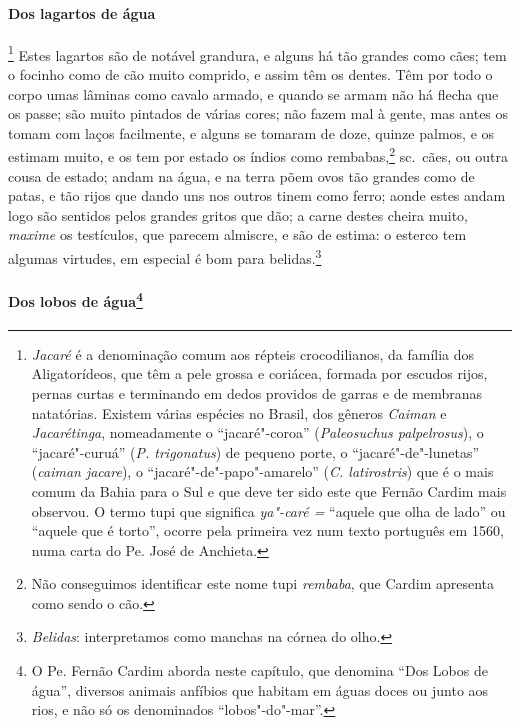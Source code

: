 \paragraph{Dos lagartos de água}

\footnote{ \textit{Jacaré} é a denominação
comum aos répteis crocodilianos, da família dos Aligatorídeos, que têm
a pele grossa e coriácea, formada por escudos rijos, pernas curtas e
terminando em dedos providos de garras e de membranas natatórias.
Existem várias espécies no Brasil, dos gêneros \textit{Caiman} e 
\textit{Jacarétinga}, nomeadamente o ``jacaré"-coroa''
(\textit{Paleosuchus palpelrosus}), o ``jacaré"-curuá'' (\textit{P.
trigonatus}) de pequeno porte, o ``jacaré"-de"-lunetas'' (\textit{caiman
jacare}), o ``jacaré"-de"-papo"-amarelo'' (\textit{C. latirostris}) que é o
mais comum da Bahia para o Sul e que deve ter sido este que Fernão
Cardim mais observou. O termo tupi que significa \textit{ya"-caré =}
``aquele que olha de lado'' ou ``aquele que é torto'', ocorre pela primeira
vez num texto português em 1560, numa carta do Pe. José de
Anchieta.} Estes lagartos são de notável grandura, e alguns
há tão grandes como cães; tem o focinho como de cão muito comprido, e
assim têm os dentes. Têm por todo o corpo umas lâminas como cavalo
armado, e quando se armam não há flecha que os passe; são muito
pintados de várias cores; não fazem mal à gente, mas antes os tomam com
laços facilmente, e alguns se tomaram de doze, quinze palmos, e os
estimam muito, e os tem por estado os índios como rembabas,\footnote{ Não 
conseguimos identificar este nome tupi \textit{rembaba}, que
Cardim apresenta como sendo o cão.} sc.~cães, ou outra cousa de estado;
andam na água, e na terra põem ovos tão grandes como de patas, e tão
rijos que dando uns nos outros tinem como ferro; aonde estes andam logo
são sentidos pelos grandes gritos que dão; a carne destes cheira muito,
\textit{maxime} os testículos, que parecem almiscre, e são de estima: o esterco
tem algumas virtudes, em especial é bom para belidas.\footnote{ \textit{Belidas}: 
interpretamos como manchas na córnea do olho.} 


\paragraph[Dos lobos de água]{Dos lobos de água\protect\footnote{ O Pe. Fernão Cardim aborda
neste capítulo, que denomina ``Dos Lobos de água'', diversos animais
anfíbios que habitam em águas doces ou junto aos rios, e não só os
denominados ``lobos"-do"-mar''.}}

